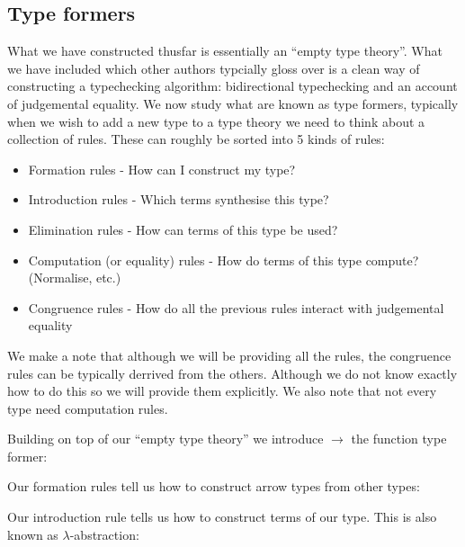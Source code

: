 \subsection{Type formers}
What we have constructed thusfar is essentially an ``empty type theory''. What we have included which other authors typcially gloss over is a clean way of constructing a typechecking algorithm: bidirectional typechecking and an account of judgemental equality. We now study what are known as type formers, typically when we wish to add a new type to a type theory we need to think about a collection of rules. These can roughly be sorted into 5 kinds of rules:

\begin{itemize}
    \item Formation rules - How can I construct my type?
    \item Introduction rules - Which terms synthesise this type?
    \item Elimination rules - How can terms of this type be used?
    \item Computation (or equality) rules - How do terms of this type compute? (Normalise, etc.)
    \item Congruence rules - How do all the previous rules interact with judgemental equality
\end{itemize}

We make a note that although we will be providing all the rules, the congruence rules can be typically derrived from the others. Although we do not know exactly how to do this so we will provide them explicitly. We also note that not every type need computation rules.

Building on top of our ``empty type theory'' we introduce $\to$ the function type former:

\begin{defin}

    Our formation rules tell us how to construct arrow types from other types:
    
    \begin{prooftree}
    \end{prooftree}

\end{defin}

\begin{defin}

    Our introduction rule tells us how to construct terms of our type. This is also known as $\lambda$-abstraction:

    \begin{prooftree}
    \end{prooftree}

\end{defin}

